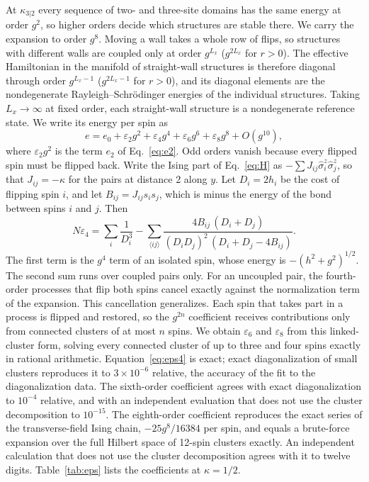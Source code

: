 \documentclass[
 aps,prb,
 twocolumn,
 superscriptaddress,
 longbibliography,
 nofootinbib,
 floatfix
]{revtex4-2}
\begin{document}
At $\kappa_{3|2}$ every sequence of two- and three-site domains has the same energy at order $g^2$, so
higher orders decide which structures are stable there. We carry the expansion to order $g^8$. Moving a
wall takes a whole row of flips, so structures with different walls are coupled only at order $g^{L_x}$
($g^{2L_x}$ for $r>0$). The effective Hamiltonian in the manifold of straight-wall structures is therefore
diagonal through order $g^{L_x-1}$ ($g^{2L_x-1}$ for $r>0$), and its diagonal elements are the nondegenerate Rayleigh--Schr\"odinger
energies of the individual structures. Taking $L_x\to\infty$ at fixed order, each straight-wall structure is a
nondegenerate reference state. We write its energy per spin as
\begin{equation}
e=e_0+\varepsilon_2g^2+\varepsilon_4g^4+\varepsilon_6g^6+\varepsilon_8g^8+O(g^{10}),
\label{eq:series}
\end{equation}
where $\varepsilon_2g^2$ is the term $e_2$ of Eq.~\eqref{eq:e2}. Odd orders vanish because every flipped
spin must be flipped back. Write the Ising part of Eq.~\eqref{eq:H} as
$-\sum J_{ij}\hat\sigma^z_i\hat\sigma^z_j$, so that $J_{ij}=-\kappa$ for the pairs at distance 2 along $y$.
Let $D_i=2h_i$ be the cost of flipping spin $i$, and let $B_{ij}=J_{ij}s_is_j$, which is minus the energy of
the bond between spins $i$ and $j$. Then
\begin{equation}
N\varepsilon_4=\sum_i\frac{1}{D_i^3}
-\sum_{\langle ij\rangle}\frac{4B_{ij}\,(D_i+D_j)}{(D_iD_j)^2\,(D_i+D_j-4B_{ij})} .
\label{eq:eps4}
\end{equation}
The first term is the $g^4$ term of an isolated spin, whose energy is $-(h^2+g^2)^{1/2}$. The second sum
runs over coupled pairs only. For an uncoupled pair, the fourth-order processes that flip both spins cancel
exactly against the normalization term of the expansion. This cancellation generalizes. Each spin
that takes part in a process is flipped and restored, so the $g^{2n}$ coefficient receives contributions
only from connected clusters of at most $n$ spins. We obtain $\varepsilon_6$ and $\varepsilon_8$ from this
linked-cluster form, solving every connected cluster of up to three and four spins exactly in rational
arithmetic.
Equation~\eqref{eq:eps4} is exact; exact diagonalization of small clusters reproduces it to
$3\times10^{-6}$ relative, the accuracy of the fit to the diagonalization data.
The sixth-order coefficient agrees with exact diagonalization to $10^{-4}$ relative,
and with an independent evaluation that does not use the cluster decomposition to $10^{-15}$.
The eighth-order coefficient reproduces the exact series of the transverse-field Ising chain,
$-25g^8/16384$ per spin, and equals a brute-force expansion over the full Hilbert space of 12-spin
clusters exactly. An independent calculation that does not use the cluster decomposition agrees with it to
twelve digits.
Table~\ref{tab:eps} lists the coefficients at $\kappa=1/2$.
\end{document}
